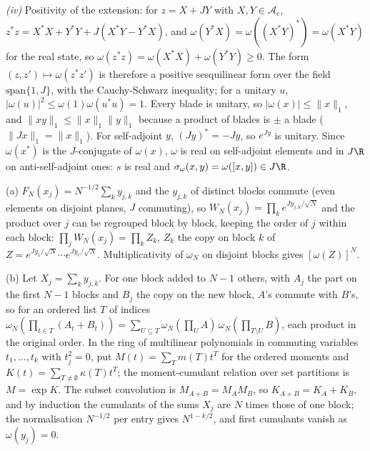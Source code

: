 \emph{(iv)} Positivity of the extension: for $z = X + JY$ with $X, Y \in \mathcal{A}_{e}$, $z^{*}z = X^{*}X + Y^{*}Y + J(X^{*}Y - Y^{*}X)$, and $\omega(Y^{*}X) = \omega((X^{*}Y)^{*}) = \omega(X^{*}Y)$ for the real state, so $\omega(z^{*}z) = \omega(X^{*}X) + \omega(Y^{*}Y) \ge 0$. The form $(z, z') \mapsto \omega(z^{*}z')$ is therefore a positive sesquilinear form over the field $\mathrm{span}\{1, J\}$, with the Cauchy-Schwarz inequality; for a unitary $u$, $|\omega(u)|^{2} \le \omega(1)\omega(u^{*}u) = 1$. Every blade is unitary, so $|\omega(x)| \le \|x\|_{1}$, and $\|xy\|_{1} \le \|x\|_{1}\|y\|_{1}$ because a product of blades is $\pm$ a blade ($\|Jx\|_{1} = \|x\|_{1}$). For self-adjoint $y$, $(Jy)^{*} = -Jy$, so $e^{Jy}$ is unitary. Since $\omega(x^{*})$ is the $J$-conjugate of $\omega(x)$, $\omega$ is real on self-adjoint elements and in $J\R$ on anti-self-adjoint ones: $s$ is real and $\sigma_{\omega}(x, y) = \omega([x, y]) \in J\R$.

(a) $F_{N}(x_{j}) = N^{-1/2}\sum_{k}y_{j,k}$ and the $y_{j,k}$ of distinct blocks commute (even elements on disjoint planes, $J$ commuting), so $W_{N}(x_{j}) = \prod_{k}e^{Jy_{j,k}/\sqrt N}$ and the product over $j$ can be regrouped block by block, keeping the order of $j$ within each block: $\prod_{j}W_{N}(x_{j}) = \prod_{k}Z_{k}$, $Z_{k}$ the copy on block $k$ of $Z = e^{Jy_{1}/\sqrt N}\cdots e^{Jy_{r}/\sqrt N}$. Multiplicativity of $\omega_{N}$ on disjoint blocks gives $[\omega(Z)]^{N}$.

(b) Let $X_{j} = \sum_{k}y_{j,k}$. For one block added to $N - 1$ others, with $A_{j}$ the part on the first $N - 1$ blocks and $B_{j}$ the copy on the new block, $A$'s commute with $B$'s, so for an ordered list $T$ of indices $\omega_{N}(\prod_{t \in T}(A_{t} + B_{t})) = \sum_{U \subseteq T}\omega_{N}(\prod_{U}A)\,\omega_{N}(\prod_{T \setminus U}B)$, each product in the original order. In the ring of multilinear polynomials in commuting variables $t_{1}, \dots, t_{k}$ with $t_{j}^{2} = 0$, put $M(t) = \sum_{T}m(T)t^{T}$ for the ordered moments and $K(t) = \sum_{T \ne \emptyset}\kappa(T)t^{T}$; the moment-cumulant relation over set partitions is $M = \exp K$. The subset convolution is $M_{A + B} = M_{A}M_{B}$, so $K_{A + B} = K_{A} + K_{B}$, and by induction the cumulants of the sums $X_{j}$ are $N$ times those of one block; the normalisation $N^{-1/2}$ per entry gives $N^{1 - k/2}$, and first cumulants vanish as $\omega(y_{j}) = 0$.

